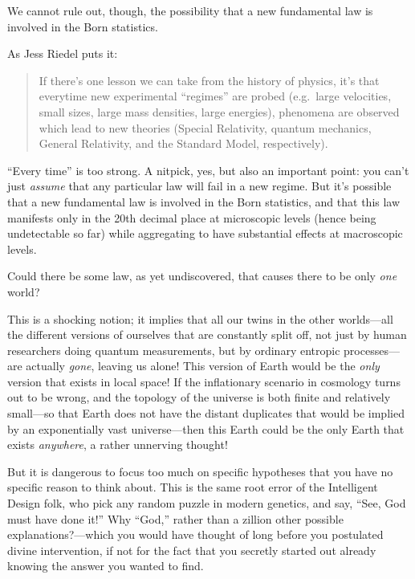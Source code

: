 {
 We cannot rule out, though, the possibility that a new fundamental
law is involved in the Born statistics.}

{
 As Jess Riedel puts it:}

\begin{quote}
{
 If there's one lesson we can take from the history
of physics, it's that everytime new experimental
``regimes'' are probed (e.g.~large
velocities, small sizes, large mass densities, large energies),
phenomena are observed which lead to new theories (Special Relativity,
quantum mechanics, General Relativity, and the Standard Model,
respectively).}
\end{quote}

{
 ``Every time'' is too strong. A
nitpick, yes, but also an important point: you can't
just \textit{assume} that any particular law will fail in a new regime.
But it's possible that a new fundamental law is
involved in the Born statistics, and that this law manifests only in
the 20th decimal place at microscopic levels (hence being undetectable
so far) while aggregating to have substantial effects at macroscopic
levels.}

{
 Could there be some law, as yet undiscovered, that causes there to
be only \textit{one} world?}

{
 This is a shocking notion; it implies that all our twins in the
other worlds---all the different versions of ourselves that are
constantly split off, not just by human researchers doing quantum
measurements, but by ordinary entropic processes---are actually
\textit{gone}, leaving us alone! This version of Earth would be the
\textit{only} version that exists in local space! If the inflationary
scenario in cosmology turns out to be wrong, and the topology of the
universe is both finite and relatively small---so that Earth does not
have the distant duplicates that would be implied by an exponentially
vast universe---then this Earth could be the only Earth that exists
\textit{anywhere}, a rather unnerving thought!}

{
 But it is dangerous to focus too much on specific hypotheses that
you have no specific reason to think about. This is the same root error
of the Intelligent Design folk, who pick any random puzzle in modern
genetics, and say, ``See, God must have done
it!'' Why ``God,''
rather than a zillion other possible explanations?---which you would
have thought of long before you postulated divine intervention, if not
for the fact that you secretly started out already knowing the answer
you wanted to find.}

